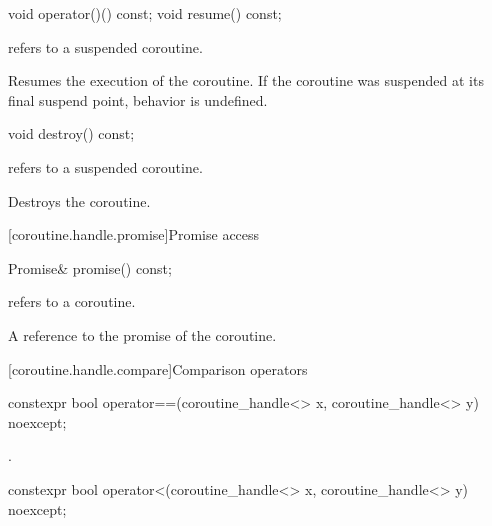%
%
\begin{itemdecl}
void operator()() const;
void resume() const;
\end{itemdecl}

\begin{itemdescr}
\pnum
\requires {} refers to a suspended coroutine.

\pnum
\effects Resumes the execution of the coroutine. If the coroutine
was suspended at its final suspend point, behavior is undefined.
\end{itemdescr}

%
\begin{itemdecl}
void destroy() const;
\end{itemdecl}

\begin{itemdescr}
\pnum
\requires {} refers to a suspended coroutine.

\pnum
\effects Destroys the coroutine.
\end{itemdescr}

[coroutine.handle.promise]{Promise access}

%
\begin{itemdecl}
Promise& promise() const;
\end{itemdecl}

\begin{itemdescr}
\pnum
\requires {} refers to a coroutine.

\pnum
\returns A reference to the promise of the coroutine.
\end{itemdescr}

[coroutine.handle.compare]{Comparison operators}

%
%
\begin{itemdecl}
constexpr bool operator==(coroutine_handle<> x, coroutine_handle<> y) noexcept;
\end{itemdecl}

\begin{itemdescr}
\pnum \returns {}.
\end{itemdescr}

%
%
%
%
\begin{itemdecl}
constexpr bool operator<(coroutine_handle<> x, coroutine_handle<> y) noexcept;
\end{itemdecl}

